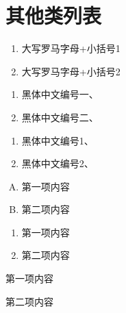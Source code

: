 \section*{其他类列表}
\begin{enumerate}[label=(\Roman*)]
	\item 大写罗马字母+小括号1
	\item 大写罗马字母+小括号2 
\end{enumerate}

\begin{enumerate}[label=\heiti\chinese*、]
	\item 黑体中文编号一、
	\item 黑体中文编号二、
\end{enumerate}

\begin{enumerate}[label=\heiti\arabic*、]
	\item 黑体中文编号1、
	\item 黑体中文编号2、
\end{enumerate}

\begin{enumerate}[A.]
	\item 第一项内容
	\item 第二项内容
\end{enumerate}

\begin{enumerate}[\heiti a.]
	\item 第一项内容
	\item 第二项内容
\end{enumerate}

\begin{pul}{2em}
	\item 第一项内容
	\item 第二项内容 
\end{pul}